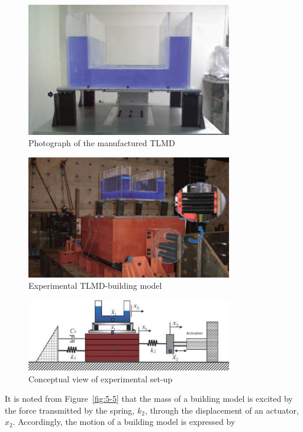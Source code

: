 \begin{figure}[ht]
\centering
\includegraphics[width=0.8\textwidth] {figure/5-2.eps}
\caption{Photograph of the manufactured TLMD}
\label{fig:5-2}
\end{figure}

\begin{figure}[ht]
\centering
\includegraphics[width=0.8\textwidth] {figure/5-3.eps}
\caption{Experimental TLMD-building model}
\label{fig:5-3}
\end{figure}

\begin{figure}[ht]
\centering
\includegraphics[width=0.8\textwidth] {figure/5-4.eps}
\caption{Conceptual view of experimental set-up}
\label{fig:5-4}
\end{figure}

It is noted from Figure~\ref{fig:5-5} that the mass of a building model is excited by the force transmitted by the spring, $k_{2}$, through the displacement of an actuator, $x_{2}$. Accordingly, the motion of a building model is expressed by


